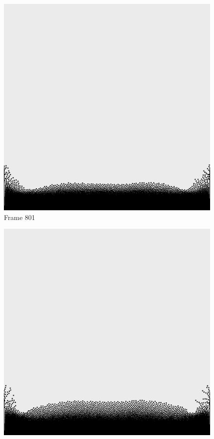\documentclass[a4paper, 12pt, oneside]{book}
\begin{document}
\begin{figure}[!ht]
        \begin{center}
            \includegraphics[width=\linewidth]{images/test_case_1/801.png}
            Frame 801
        \end{center}
    \endminipage
    \hfill
        \begin{center}
            \includegraphics[width=\linewidth]{images/test_case_1/821.png}

\end{center}
\end{figure}
\end{document}
